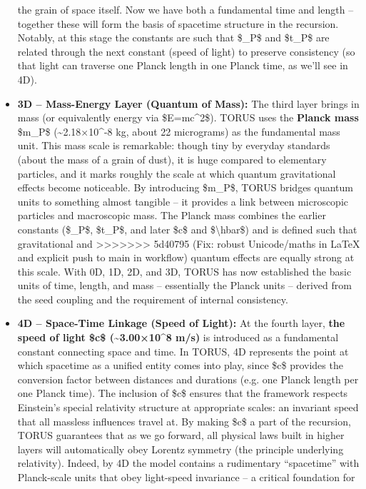 \documentclass[]{article}
\begin{document}
\begin{itemize}
  the grain of space itself. Now we have both a fundamental time and
  length -- together these will form the basis of spacetime structure in
  the recursion. Notably, at this stage the constants are such that
  \$\ell\_P\$ and \$t\_P\$ are related through the next constant (speed of
  light) to preserve consistency (so that light can traverse one Planck
  length in one Planck time, as we'll see in 4D).
\item
  \textbf{3D -- Mass-Energy Layer (Quantum of Mass):} The third layer
  brings in mass (or equivalently energy via \$E=mc\^{}2\$). TORUS uses
  the \textbf{Planck mass} \$m\_P\$ (\textasciitilde{}2.18×10\^{}-8 kg,
  about 22 micrograms) as the fundamental mass unit​. This mass scale is
  remarkable: though tiny by everyday standards (about the mass of a
  grain of dust), it is huge compared to elementary particles, and it
  marks roughly the scale at which quantum gravitational effects become
  noticeable. By introducing \$m\_P\$, TORUS bridges quantum units to
  something almost tangible -- it provides a link between microscopic
  particles and macroscopic mass. The Planck mass combines the earlier
  constants (\$\ell\_P\$, \$t\_P\$, and later \$c\$ and
  \$\textbackslash{}hbar\$) and is defined such that gravitational and
>>>>>>> 5d40795 (Fix: robust Unicode/maths in LaTeX and explicit push to main in workflow)
  quantum effects are equally strong at this scale. With 0D, 1D, 2D, and
  3D, TORUS has now established the basic units of time, length, and
  mass -- essentially the Planck units -- derived from the seed coupling
  and the requirement of internal consistency.
\item
  \textbf{4D -- Space-Time Linkage (Speed of Light):} At the fourth
  layer, \textbf{the speed of light \$c\$ (\textasciitilde{}3.00×10\^{}8
  m/s)} is introduced as a fundamental constant connecting space and
  time​. In TORUS, 4D represents the point at which spacetime as a
  unified entity comes into play, since \$c\$ provides the conversion
  factor between distances and durations (e.g. one Planck length per one
  Planck time). The inclusion of \$c\$ ensures that the framework
  respects Einstein's special relativity structure at appropriate
  scales: an invariant speed that all massless influences travel at. By
  making \$c\$ a part of the recursion, TORUS guarantees that as we go
  forward, all physical laws built in higher layers will automatically
  obey Lorentz symmetry (the principle underlying relativity). Indeed,
  by 4D the model contains a rudimentary ``spacetime'' with Planck-scale
  units that obey light-speed invariance -- a critical foundation for

\end{itemize}
\end{document}
